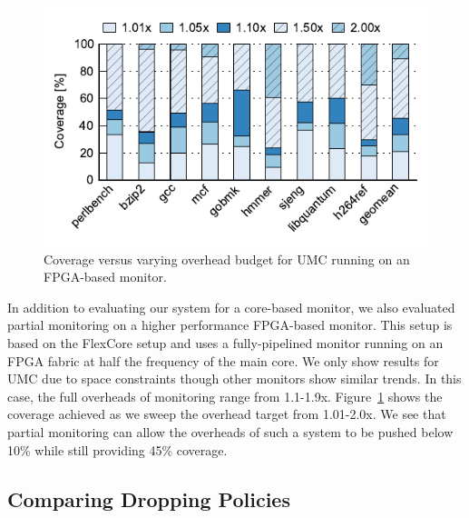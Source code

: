\begin{figure}
  \begin{center}
    \vspace{-0.1in}
    \includegraphics[width=\linewidth]{figs/data_fpga_umc_sweep.pdf}
    \vspace{-0.2in}
    \caption{Coverage versus varying overhead budget for UMC running on an FPGA-based monitor.}
    \label{fig:evaluation.fpga_umc_sweep}
    \vspace{-0.1in}
  \end{center}
\end{figure}

In addition to evaluating our system for a core-based monitor, we also
evaluated partial monitoring on a higher performance FPGA-based monitor. This
setup is based on the FlexCore \cite{flexcore-micro10} setup and uses a
fully-pipelined monitor running on an FPGA fabric at half the frequency of the
main core. We only show results for UMC due to space constraints though other
monitors show similar trends. In this case, the full overheads of
monitoring range from 1.1-1.9x. Figure~\ref{fig:evaluation.fpga_umc_sweep} shows
the coverage achieved as we sweep the overhead target from 1.01-2.0x. We see that partial
monitoring can allow the overheads of such a system to be pushed below 10\%
while still providing 45\% coverage.

\subsection{Comparing Dropping Policies}

